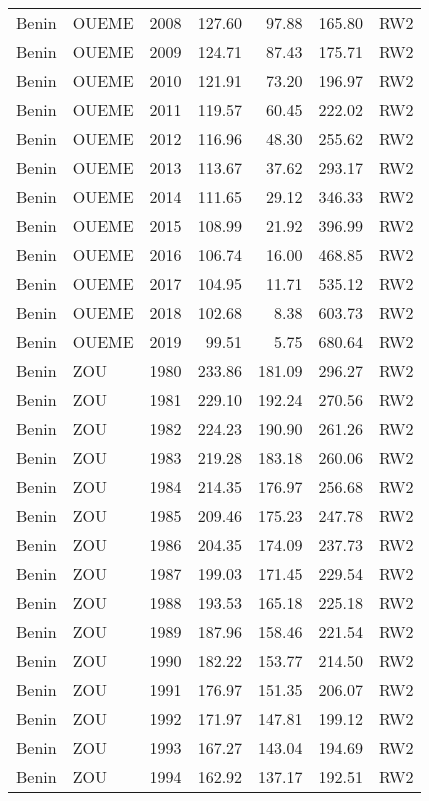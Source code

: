 \begin{longtable}{lllrrrl}
  Benin & OUEME & 2008 & 127.60 & 97.88 & 165.80 & RW2 \\ 
  Benin & OUEME & 2009 & 124.71 & 87.43 & 175.71 & RW2 \\ 
  Benin & OUEME & 2010 & 121.91 & 73.20 & 196.97 & RW2 \\ 
  Benin & OUEME & 2011 & 119.57 & 60.45 & 222.02 & RW2 \\ 
  Benin & OUEME & 2012 & 116.96 & 48.30 & 255.62 & RW2 \\ 
  Benin & OUEME & 2013 & 113.67 & 37.62 & 293.17 & RW2 \\ 
  Benin & OUEME & 2014 & 111.65 & 29.12 & 346.33 & RW2 \\ 
  Benin & OUEME & 2015 & 108.99 & 21.92 & 396.99 & RW2 \\ 
  Benin & OUEME & 2016 & 106.74 & 16.00 & 468.85 & RW2 \\ 
  Benin & OUEME & 2017 & 104.95 & 11.71 & 535.12 & RW2 \\ 
  Benin & OUEME & 2018 & 102.68 & 8.38 & 603.73 & RW2 \\ 
  Benin & OUEME & 2019 & 99.51 & 5.75 & 680.64 & RW2 \\ 
  Benin & ZOU & 1980 & 233.86 & 181.09 & 296.27 & RW2 \\ 
  Benin & ZOU & 1981 & 229.10 & 192.24 & 270.56 & RW2 \\ 
  Benin & ZOU & 1982 & 224.23 & 190.90 & 261.26 & RW2 \\ 
  Benin & ZOU & 1983 & 219.28 & 183.18 & 260.06 & RW2 \\ 
  Benin & ZOU & 1984 & 214.35 & 176.97 & 256.68 & RW2 \\ 
  Benin & ZOU & 1985 & 209.46 & 175.23 & 247.78 & RW2 \\ 
  Benin & ZOU & 1986 & 204.35 & 174.09 & 237.73 & RW2 \\ 
  Benin & ZOU & 1987 & 199.03 & 171.45 & 229.54 & RW2 \\ 
  Benin & ZOU & 1988 & 193.53 & 165.18 & 225.18 & RW2 \\ 
  Benin & ZOU & 1989 & 187.96 & 158.46 & 221.54 & RW2 \\ 
  Benin & ZOU & 1990 & 182.22 & 153.77 & 214.50 & RW2 \\ 
  Benin & ZOU & 1991 & 176.97 & 151.35 & 206.07 & RW2 \\ 
  Benin & ZOU & 1992 & 171.97 & 147.81 & 199.12 & RW2 \\ 
  Benin & ZOU & 1993 & 167.27 & 143.04 & 194.69 & RW2 \\ 
  Benin & ZOU & 1994 & 162.92 & 137.17 & 192.51 & RW2 \\ 

\end{longtable}
